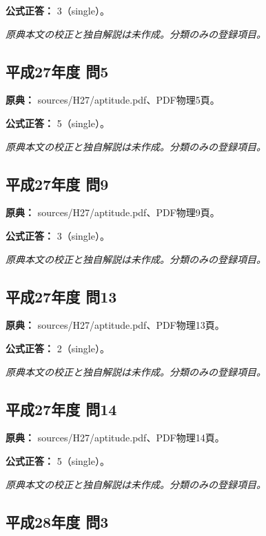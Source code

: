 \textbf{公式正答：} 3（single）。

\par\textit{原典本文の校正と独自解説は未作成。分類のみの登録項目。}

\subsection{平成27年度 問5}
\label{q:h27-reg-apt-05}

\noindent\textbf{原典：} sources/H27/aptitude.pdf、PDF物理5頁。

\textbf{公式正答：} 5（single）。

\par\textit{原典本文の校正と独自解説は未作成。分類のみの登録項目。}

\subsection{平成27年度 問9}
\label{q:h27-reg-apt-09}

\noindent\textbf{原典：} sources/H27/aptitude.pdf、PDF物理9頁。

\textbf{公式正答：} 3（single）。

\par\textit{原典本文の校正と独自解説は未作成。分類のみの登録項目。}

\subsection{平成27年度 問13}
\label{q:h27-reg-apt-13}

\noindent\textbf{原典：} sources/H27/aptitude.pdf、PDF物理13頁。

\textbf{公式正答：} 2（single）。

\par\textit{原典本文の校正と独自解説は未作成。分類のみの登録項目。}

\subsection{平成27年度 問14}
\label{q:h27-reg-apt-14}

\noindent\textbf{原典：} sources/H27/aptitude.pdf、PDF物理14頁。

\textbf{公式正答：} 5（single）。

\par\textit{原典本文の校正と独自解説は未作成。分類のみの登録項目。}

\subsection{平成28年度 問3}
\label{q:h28-reg-apt-03}

